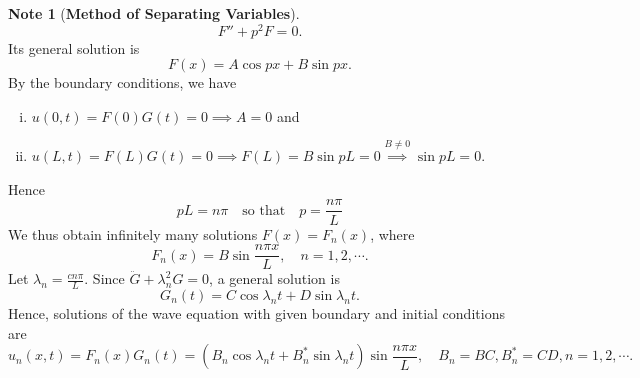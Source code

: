 \documentclass[12pt,openany]{book}
\theoremstyle{definition}
\newtheorem*{note}{Note}
\begin{document}
\begin{note}[\bf Method of Separating Variables]
		\[
		F'' + p^2 F = 0.
		\] Its general solution is
		\[
		F(x) = A \cos px + B \sin px.
		\] By the boundary conditions, we have \begin{enumerate}[(i)]
			\item $u(0, t) = F(0)G(t) = 0\implies A=0$ and
			\item $u(L, t) = F(L)G(t) = 0\implies F(L)= B \sin pL = 0\overset{B\neq 0}{\implies} \sin pL = 0$.
		\end{enumerate} Hence
		\[
		pL = n\pi \quad \text{so that} \quad p = \frac{n\pi}{L}
		\] We thus obtain infinitely many solutions \( F(x) = F_n(x) \), where
		\[
		F_n(x) = B\sin \frac{n\pi x}{L}, \quad n = 1,2,\cdots.
		\]
		Let $\lambda_n = \frac{cn\pi}{L}$. Since $\ddot{G} + \lambda_n^2 G = 0$, a general solution is
		\[
		G_n(t) = C \cos \lambda_n t + D \sin \lambda_n t.
		\] Hence, solutions of the wave equation with given boundary and initial conditions are
		\[
		u_n(x, t) = F_n(x)G_n(t)=(B_n \cos \lambda_n t + B_n^* \sin \lambda_n t) \sin \frac{n\pi x}{L}, \quad B_n=BC, B_n^*=CD, n = 1,2,\cdots.
		\]
	\end{note}
	\vspace{12pt}
\end{document}
